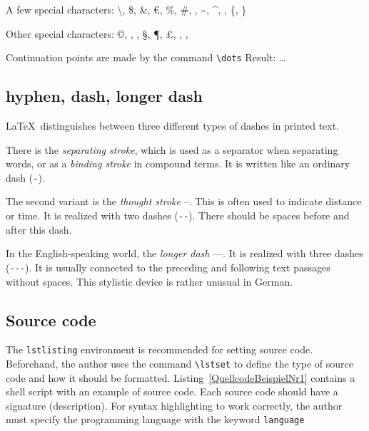 \documentclass{llncs}
\begin{document}
A few special characters: \textbackslash, \$, \&, \euro, \%, \#, \textunderscore, \textasciitilde, \textasciicircum, \textbar, \{, \}

Other special characters: \copyright, \textregistered, \texttrademark, \S, \P, \pounds, \dag, \ddag, \textbullet

Continuation points are made by the command \verb!\dots! Result: \dots

\subsection{hyphen, dash, longer dash}

\LaTeX\ distinguishes between three different types of dashes in printed text.

There is the \emph{separating stroke}, which is used as a separator when separating words, or as a \emph{binding stroke} in compound terms. It is written like an ordinary dash (\verb!-!).

The second variant is the \emph{thought stroke} --. This is often used to indicate distance or time. It is realized with two dashes (\verb!--!). There should be spaces before and after this dash.

In the English-speaking world, the \emph{longer
dash} ---. It is realized with three dashes (\verb!---!). It is usually connected to the preceding and following text passages without spaces. This stylistic device is rather unusual in German.

\subsection{Source code}

The \verb!lstlisting! environment is recommended for setting source code. Beforehand, the author uses the command \verb!\lstset! to define the type of source code and how it should be formatted. Listing~\ref{QuellcodeBeispielNr1} contains a shell script with an example of source code. Each source code should have a signature (description). For syntax highlighting to work correctly, the author must specify the programming language with the keyword \verb!language! 
\end{document}
